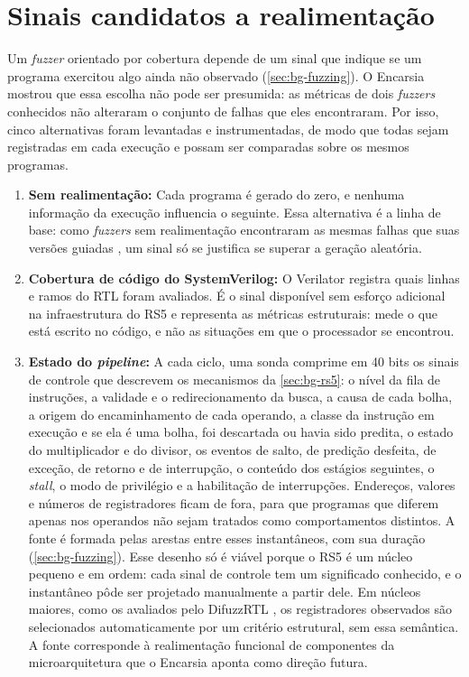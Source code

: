 \section{Sinais candidatos a realimentação}\label{sec:previo-fontes}

Um \textit{fuzzer} orientado por cobertura depende de um sinal que indique se um programa exercitou algo ainda não observado (\cref{sec:bg-fuzzing}). O Encarsia \citep{Bolcskei:2025:Encarsia} mostrou que essa escolha não pode ser presumida: as métricas de dois \textit{fuzzers} conhecidos não alteraram o conjunto de falhas que eles encontraram. Por isso, cinco alternativas foram levantadas e instrumentadas, de modo que todas sejam registradas em cada execução e possam ser comparadas sobre os mesmos programas.

\begin{enumerate}
    \item \textbf{Sem realimentação:} Cada programa é gerado do zero, e nenhuma informação da execução influencia o seguinte. Essa alternativa é a linha de base: como \textit{fuzzers} sem realimentação encontraram as mesmas falhas que suas versões guiadas \citep{Bolcskei:2025:Encarsia}, um sinal só se justifica se superar a geração aleatória.

    \item \textbf{Cobertura de código do SystemVerilog:} O Verilator registra quais linhas e ramos do RTL foram avaliados. É o sinal disponível sem esforço adicional na infraestrutura do RS5 e representa as métricas estruturais: mede o que está escrito no código, e não as situações em que o processador se encontrou.

    \item \textbf{Estado do \textit{pipeline}:} A cada ciclo, uma sonda comprime em 40 bits os sinais de controle que descrevem os mecanismos da \cref{sec:bg-rs5}: o nível da fila de instruções, a validade e o redirecionamento da busca, a causa de cada bolha, a origem do encaminhamento de cada operando, a classe da instrução em execução e se ela é uma bolha, foi descartada ou havia sido predita, o estado do multiplicador e do divisor, os eventos de salto, de predição desfeita, de exceção, de retorno e de interrupção, o conteúdo dos estágios seguintes, o \textit{stall}, o modo de privilégio e a habilitação de interrupções. Endereços, valores e números de registradores ficam de fora, para que programas que diferem apenas nos operandos não sejam tratados como comportamentos distintos. A fonte é formada pelas arestas entre esses instantâneos, com sua duração (\cref{sec:bg-fuzzing}). Esse desenho só é viável porque o RS5 é um núcleo pequeno e em ordem: cada sinal de controle tem um significado conhecido, e o instantâneo pôde ser projetado manualmente a partir dele. Em núcleos maiores, como os avaliados pelo DifuzzRTL \citep{Hur:2021:DifuzzRTL}, os registradores observados são selecionados automaticamente por um critério estrutural, sem essa semântica. A fonte corresponde à realimentação funcional de componentes da microarquitetura que o Encarsia aponta como direção futura.


\end{enumerate}
